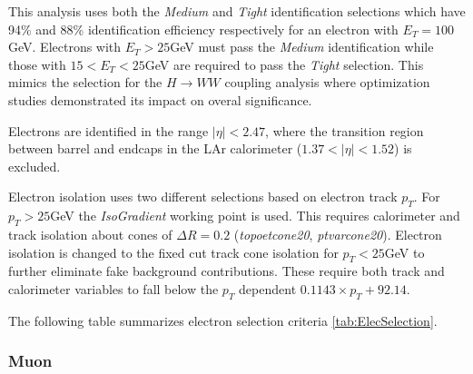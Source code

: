 This analysis uses both the \textit{Medium} and \textit{Tight} identification selections which have 94\% and 88\% identification efficiency respectively for an electron with $E_T=100$ GeV. Electrons with $E_T>25$GeV must pass the \textit{Medium} identification while those with $15<E_T<25$GeV are required to pass the \textit{Tight} selection. This mimics the selection for the $H\rightarrow WW$ coupling analysis where optimization studies demonstrated its impact on overal significance. 

Electrons are identified in the range $|\eta|<2.47$, where the transition region between barrel and endcaps in the LAr calorimeter ($1.37<|\eta|<1.52$) is excluded.

Electron isolation uses two different selections based on electron track $p_T$. For $p_T>25$GeV the \textit{IsoGradient} working point is used. This requires calorimeter and track isolation about cones of $\Delta R =0.2$ (\textit{topoetcone20}, \textit{ptvarcone20}). Electron isolation is changed to the fixed cut track cone isolation for $p_T <25$GeV to further eliminate fake background contributions. These require both track and calorimeter variables to fall below the $p_T$ dependent $0.1143\times p_T + 92.14$. 

The following table summarizes electron selection criteria \ref{tab:ElecSelection}.

\begin{table}[h!]
  \centering
  \caption{Electron selections}
  \label{tab:ElecSelection}
\end{table}

\subsubsection{Muon}

